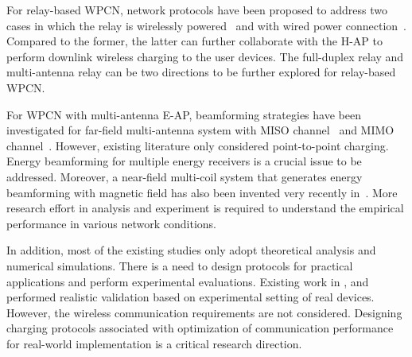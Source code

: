 \documentclass[twocolumn,10pt]{IEEEtran}
\begin{document}
For relay-based WPCN, network protocols have been proposed to address two cases in which the relay is wirelessly powered~\cite{H.2014Chen} and with wired power connection~\cite{H1404.4120Chen}. Compared to the former, the latter can further collaborate with the H-AP to perform downlink wireless charging to the user devices. The full-duplex relay and multi-antenna relay can be two directions to be further explored for relay-based WPCN. 

For WPCN with multi-antenna E-AP, beamforming strategies have been investigated for far-field multi-antenna system with MISO channel~\cite{G.YangTSP} and MIMO channel~\cite{Y.1403.7870Zeng}. However, existing literature only considered point-to-point charging. Energy beamforming for multiple energy receivers is a crucial issue to be addressed. Moreover, a near-field multi-coil system that generates energy beamforming with magnetic field has also been invented very recently in~\cite{J.2014Jadidian}. More research effort in analysis and experiment is required to understand the empirical performance in various network conditions.    

In addition, most of the existing studies only adopt theoretical analysis and numerical simulations. There is a need to design protocols for practical applications and perform experimental evaluations.  Existing work in \cite{S.2015Nikoletseas}, \cite{S.Nikoletseas2015} and \cite{Q.1504.00639Liu} performed realistic validation based on experimental setting of real devices. However,  the wireless communication requirements are not considered. Designing charging protocols associated with optimization of communication performance for real-world implementation is a critical research direction.    
\end{document}
